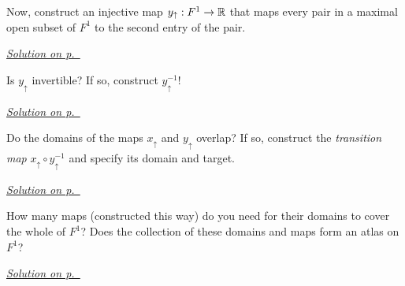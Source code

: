 \begin{exercise}\label{ex:topologicalmfds-4}
Now, construct an injective map $y_{\uparrow}:F^1 \to \mathbb{R}$ that maps every pair in a maximal open subset of $F^1$ to the second entry of the pair.
\end{exercise}
\hyperref[sol:topologicalmfds-4]{\small \textit{Solution on p.~\pageref*{sol:topologicalmfds-4}}}

\begin{exercise}\label{ex:topologicalmfds-5}
Is $y_{\uparrow}$ invertible? If so, construct $y_{\uparrow}^{-1}$!
\end{exercise}
\hyperref[sol:topologicalmfds-5]{\small \textit{Solution on p.~\pageref*{sol:topologicalmfds-5}}}

\begin{exercise}\label{ex:topologicalmfds-6}
Do the domains of the maps $x_{\uparrow}$ and $y_{\uparrow}$ overlap? If so, construct the \textit{transition map} $x_{\uparrow}\circ y_{\uparrow}^{-1}$ and specify its domain and target.
\end{exercise}
\hyperref[sol:topologicalmfds-6]{\small \textit{Solution on p.~\pageref*{sol:topologicalmfds-6}}}

\begin{exercise}\label{ex:topologicalmfds-7}
How many maps (constructed this way) do you need for their domains to cover the whole of $F^1$? Does the collection of these domains and maps form an atlas on $F^1$?
\end{exercise}
\hyperref[sol:topologicalmfds-7]{\small \textit{Solution on p.~\pageref*{sol:topologicalmfds-7}}}
